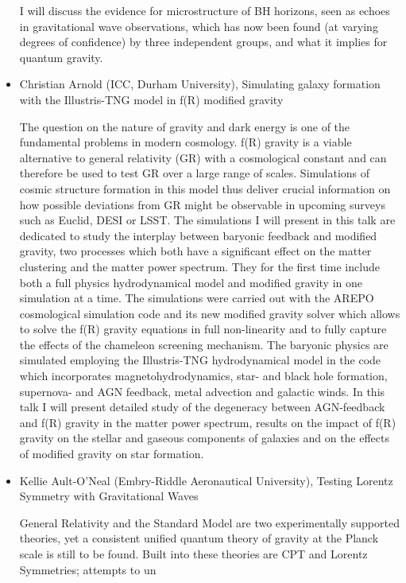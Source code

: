 \documentclass[letterpaper,12pt]{article}
\newcommand{\talk}[2]{{\fontspec{Lato Bold} #1,} {\fontspec{Lato Italic} #2}}
\begin{document}
\begin{itemize}
I will discuss the evidence for microstructure of BH horizons, seen as echoes in gravitational wave observations, which has now been found (at varying degrees of confidence) by three independent groups, and what it implies for quantum gravity.


\item \talk{Christian Arnold (ICC, Durham University)}{Simulating galaxy formation with the Illustris-TNG model in f(R) modified gravity}

The question on the nature of gravity and dark energy is one of the fundamental problems in modern cosmology. f(R) gravity is a viable alternative to general relativity (GR) with a cosmological constant and can therefore be used to test GR over a large range of scales. Simulations of cosmic structure formation in this model thus deliver crucial information on how possible deviations from GR might be observable in upcoming surveys such as Euclid, DESI or LSST. The simulations I will present in this talk are dedicated to study the interplay between baryonic feedback and modified gravity, two processes which both have a significant effect on the matter clustering and the matter power spectrum. They for the first time include both a full physics hydrodynamical model and modified gravity in one simulation at a time. The simulations were carried out with the AREPO cosmological simulation code and its new modified gravity solver which allows to solve the f(R) gravity equations in full non-linearity and to fully capture the effects of the chameleon screening mechanism. The baryonic physics are simulated employing the Illustris-TNG hydrodynamical model in the code which incorporates magnetohydrodynamics, star- and black hole formation, supernova- and AGN feedback, metal advection and galactic winds. In this talk I will present detailed study of the degeneracy between AGN-feedback and f(R) gravity in the matter power spectrum, results on the impact of f(R) gravity on the stellar and gaseous components of galaxies and on the effects of modified gravity on star formation.


\item \talk{Kellie Ault-O'Neal (Embry-Riddle Aeronautical University)}{Testing Lorentz Symmetry with Gravitational Waves}

General Relativity and the Standard Model are two experimentally supported theories, yet a consistent unified quantum theory of gravity at the Planck scale is still to be found. Built into these theories are CPT and Lorentz Symmetries; attempts to un	



\end{itemize}
\end{document}
